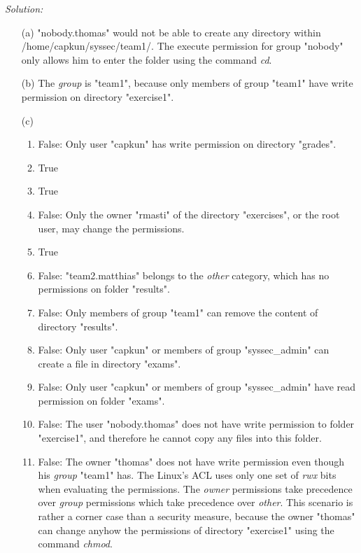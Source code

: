 \documentclass[a4paper,11pt]{article}
\newenvironment{solution}%
{\par{\noindent\small\textit{Solution:}}\vspace{-12pt}\begin{framed}}%
{\end{framed}\par}
\begin{document}
\ifsolution\begin{solution}
\begin{itemize}
\item [(a)] "nobody.thomas" would not be able to create any directory within /home/capkun/syssec/team1/. The execute permission for group "nobody" only 
allows him to enter the folder using the command \emph{cd}.  
\item [(b)] The \emph{group} is "team1", because only members of group "team1" have write permission on directory "exercise1".
\item [(c)]
\begin{enumerate}
\item False: Only user "capkun" has write permission on directory "grades".
\item True
\item True
\item False: Only the owner "rmasti" of the directory "exercises", or the root user, may change the permissions.
\item True
\item False: "team2.matthias" belongs to the \emph{other} category, which has no permissions on folder "results".
\item False: Only members of group "team1" can remove the content of directory "results".
\item False: Only user "capkun" or members of group "syssec\_admin" can create a file in directory "exams".
\item False: Only user "capkun" or members of group "syssec\_admin" have read permission on folder "exams".
\item False: The user "nobody.thomas" does not have write permission to folder "exercise1", and therefore he cannot copy any files into this folder.
\item False: The owner "thomas" does not have write permission even though his \emph{group} "team1" has. The Linux's ACL uses only one set of \emph{rwx} bits when evaluating the permissions. The \emph{owner} permissions take precedence over 
\emph{group} permissions which take precedence over \emph{other}. This scenario is rather a corner case than a security measure, because the owner "thomas" can change anyhow the permissions of directory "exercise1" using the command \emph{chmod}. 
\end{enumerate}
\end{itemize}

\end{solution}\fi
\end{document}
